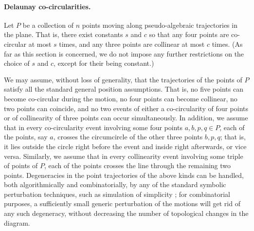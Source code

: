 \documentclass[letter,11pt]{article}
\begin{document}
\paragraph{Delaunay co-circularities.} Let $P$ be a collection of $n$ points moving along pseudo-algebraic trajectories in the plane. That is, there exist constants $s$ and $c$ so that any four points are co-circular at most $s$ times, and any three points are collinear at most $c$ times. (As far as this section is concerned, we do not impose any further restrictions on the choice of $s$ and $c$, except for their being constant.)

We may assume, without loss of generality, that the trajectories of the points of $P$ satisfy all the standard general position assumptions. That is, no five points can become co-circular during the motion, no four points can become collinear, no two points can coincide, and no two events of either a co-circularity of four points or of collinearity of three points can occur simultaneously.
In addition, we assume that in every co-circularity event involving some four points $a,b,p,q\in P$, each of the points, say $a$, crosses the circumcircle of the other three points $b,p,q$; that is, it lies outside the circle right before the event and inside right afterwards, or vice versa. Similarly, we assume that in every collinearity event involving some triple of points of $P$, each of the points crosses the line through the remaining two points.
Degeneracies in the point trajectories of the above kinds can be handled, both algorithmically and combinatorially, by any of the standard symbolic perturbation techniques, such as simulation of simplicity \cite{EM}; for combinatorial purposes, a sufficiently small generic perturbation of the motions will get rid of any such degeneracy, without decreasing the number of topological changes in the diagram.
\end{document}
